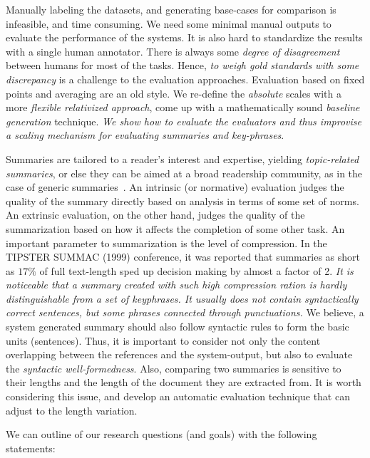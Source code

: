 \documentclass[a4paper]{report}
\begin{document}
\par Manually labeling the datasets, and generating base-cases for comparison is infeasible, and time consuming. We need some minimal manual outputs to evaluate the performance of the systems. It is also hard to standardize the results with a single human annotator. There is always some \emph{degree of disagreement} between humans for most of the tasks. Hence, \emph{to weigh gold standards with some discrepancy} is a challenge to the evaluation approaches. Evaluation based on fixed points and averaging are an old style. We re-define the \emph{absolute} scales with a more \emph{flexible relativized approach}, come up with a mathematically sound \emph{baseline generation} technique. \emph{We show how to evaluate the evaluators and thus improvise a scaling mechanism for evaluating summaries and key-phrases}.\\
\par Summaries are tailored to a reader's interest and expertise, yielding \emph{topic-related summaries}, or else they can be aimed at a broad readership community, as in the case of generic summaries~\cite{Mani99thetipster}.
An intrinsic (or normative) evaluation judges the quality of the summary directly based on analysis in terms of some set of norms. An extrinsic evaluation, on the other hand, judges the quality of the summarization based on how it affects the completion of some other task. An important parameter to summarization is the level of compression. In the TIPSTER SUMMAC (1999) conference, it was reported that summaries as short as $17\%$ of full text-length sped up decision making by almost a factor of 2. \emph{It is noticeable that a summary created with such high compression ration is hardly distinguishable from a set of keyphrases. It usually does not contain syntactically correct sentences, but some phrases connected through punctuations.} We believe,  a system generated summary should also follow syntactic rules to form the basic units (sentences).  Thus, it is important to consider not only the content overlapping between the references and the system-output, but also to evaluate the \emph{syntactic well-formedness}. Also, comparing two summaries is sensitive to their lengths and the length of the document they are extracted from. It is worth considering this issue, and develop an automatic evaluation technique that can adjust to the length variation.\\
\par We can outline of our research questions (and goals) with the following statements:
\end{document}
